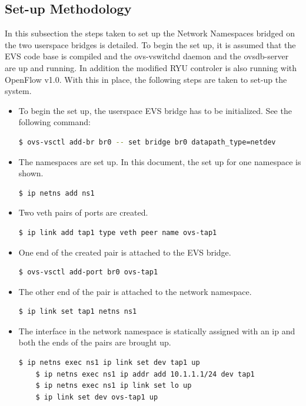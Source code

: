 \subsection{Set-up Methodology}
In this subsection the steps taken to set up the Network Namespaces bridged on the two userspace bridges is detailed. To begin the set up, it is assumed that the EVS code base is compiled and the ovs-vswitchd daemon and the ovsdb-server are up and running. In addition the modified RYU controler is also running with OpenFlow v1.0.  With this in place, the following steps are taken to set-up the system.
\begin{itemize}
\item To begin the set up, the userspace EVS bridge has to be initialized. \noindent See the following command:
 \begin{lstlisting}[language=bash]
	$ ovs-vsctl add-br br0 -- set bridge br0 datapath_type=netdev \end{lstlisting}
\end{itemize}
\begin{itemize}
	\item The namespaces are set up. In this document, the set up for one namespace is shown.
	\begin{lstlisting}[language=bash]
	$ ip netns add ns1 \end{lstlisting}
\end{itemize}
\begin{itemize}
	\item Two veth pairs of ports are created.
	\begin{lstlisting}[language=bash]
	$ ip link add tap1 type veth peer name ovs-tap1 \end{lstlisting}
\end{itemize}
\begin{itemize}
	\item One end of the created pair is attached to the EVS bridge.
	\begin{lstlisting}[language=bash]
	$ ovs-vsctl add-port br0 ovs-tap1 \end{lstlisting}
\end{itemize}
\begin{itemize}
	\item The other end of the pair is attached to the network namespace.
	\begin{lstlisting}[language=bash]
	$ ip link set tap1 netns ns1 \end{lstlisting}
\end{itemize}
\begin{itemize}
	\item The interface in the network namespace is statically assigned with an ip and both the ends of the pairs are brought up.
	\begin{lstlisting}[language=bash]
	$ ip netns exec ns1 ip link set dev tap1 up
	$ ip netns exec ns1 ip addr add 10.1.1.1/24 dev tap1
	$ ip netns exec ns1 ip link set lo up
	$ ip link set dev ovs-tap1 up \end{lstlisting}
\end{itemize}

